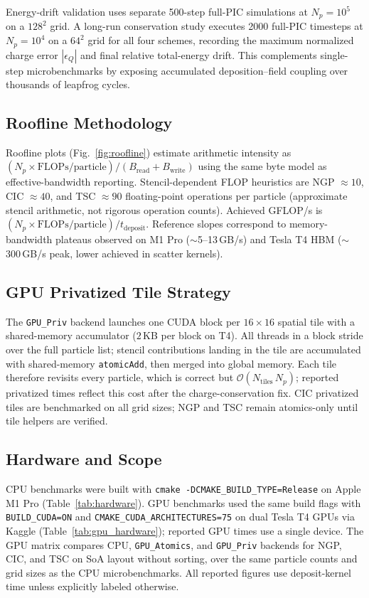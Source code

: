 Energy-drift validation uses separate 500-step full-PIC simulations at $N_p=10^5$ on a $128^2$ grid.
A long-run conservation study executes 2000 full-PIC timesteps at $N_p=10^4$ on a $64^2$ grid for all four schemes, recording the maximum normalized charge error $|\epsilon_Q|$ and final relative total-energy drift.
This complements single-step microbenchmarks by exposing accumulated deposition--field coupling over thousands of leapfrog cycles.

\subsection{Roofline Methodology}
Roofline plots (Fig.~\ref{fig:roofline}) estimate arithmetic intensity as $(N_p \times \mathrm{FLOPs/particle}) / (B_{\mathrm{read}}+B_{\mathrm{write}})$ using the same byte model as effective-bandwidth reporting.
Stencil-dependent FLOP heuristics are NGP $\approx 10$, CIC $\approx 40$, and TSC $\approx 90$ floating-point operations per particle (approximate stencil arithmetic, not rigorous operation counts).
Achieved GFLOP/s is $(N_p \times \mathrm{FLOPs/particle}) / t_{\mathrm{deposit}}$.
Reference slopes correspond to memory-bandwidth plateaus observed on M1 Pro ($\sim$5--13\,GB/s) and Tesla T4 HBM ($\sim$300\,GB/s peak, lower achieved in scatter kernels).

\subsection{GPU Privatized Tile Strategy}
The \texttt{GPU\_Priv} backend launches one CUDA block per $16\times16$ spatial tile with a shared-memory accumulator ($2$\,KB per block on T4).
All threads in a block stride over the full particle list; stencil contributions landing in the tile are accumulated with shared-memory \texttt{atomicAdd}, then merged into global memory.
Each tile therefore revisits every particle, which is correct but $\mathcal{O}(N_{\mathrm{tiles}}\,N_p)$; reported privatized times reflect this cost after the charge-conservation fix.
CIC privatized tiles are benchmarked on all grid sizes; NGP and TSC remain atomics-only until tile helpers are verified.

\subsection{Hardware and Scope}
CPU benchmarks were built with \texttt{cmake -DCMAKE\_BUILD\_TYPE=Release} on Apple M1 Pro (Table~\ref{tab:hardware}).
GPU benchmarks used the same build flags with \texttt{BUILD\_CUDA=ON} and \texttt{CMAKE\_CUDA\_ARCHITECTURES=75} on dual Tesla T4 GPUs via Kaggle (Table~\ref{tab:gpu_hardware}); reported GPU times use a single device.
The GPU matrix compares CPU, \texttt{GPU\_Atomics}, and \texttt{GPU\_Priv} backends for NGP, CIC, and TSC on SoA layout without sorting, over the same particle counts and grid sizes as the CPU microbenchmarks.
All reported figures use deposit-kernel time unless explicitly labeled otherwise.

